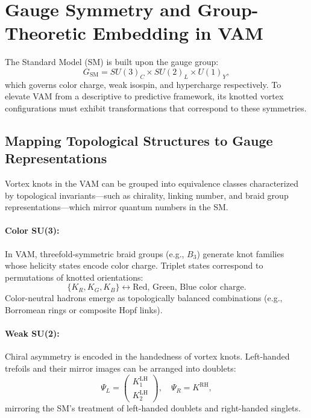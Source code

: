 \section{Gauge Symmetry and Group-Theoretic Embedding in VAM}

The Standard Model (SM) is built upon the gauge group:
\begin{equation}
    G_{\text{SM}} = SU(3)_C \times SU(2)_L \times U(1)_Y,
\end{equation}
which governs color charge, weak isospin, and hypercharge respectively. To elevate VAM from a descriptive to predictive framework, its knotted vortex configurations must exhibit transformations that correspond to these symmetries.

\subsection{Mapping Topological Structures to Gauge Representations}

Vortex knots in the VAM can be grouped into equivalence classes characterized by topological invariants—such as chirality, linking number, and braid group representations—which mirror quantum numbers in the SM.

\paragraph{Color SU(3):} In VAM, threefold-symmetric braid groups (e.g., $B_3$) generate knot families whose helicity states encode color charge. Triplet states correspond to permutations of knotted orientations:
\begin{equation}
    \{K_R, K_G, K_B\} \leftrightarrow \text{Red, Green, Blue color charge}.
\end{equation}
Color-neutral hadrons emerge as topologically balanced combinations (e.g., Borromean rings or composite Hopf links).

\paragraph{Weak SU(2):} Chiral asymmetry is encoded in the handedness of vortex knots. Left-handed trefoils and their mirror images can be arranged into doublets:
\begin{equation}
    \Psi_L = \begin{pmatrix} K^\text{LH}_1 \\ K^\text{LH}_2 \end{pmatrix}, \quad \Psi_R = K^\text{RH},
\end{equation}
mirroring the SM's treatment of left-handed doublets and right-handed singlets.

